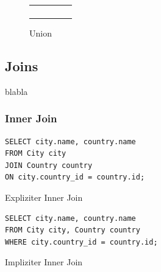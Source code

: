\documentclass[a4paper]{article}
\begin{document}
\begin{figure}[H]
\centering
  \begin{tabular}{| c | c | c | c | c |}
    \hline
    \cellcolor{cell} & \cellcolor{cell} & \cellcolor{cell} &  \cellcolor{cell} & \cellcolor{cell} \\ \hline
    \cellcolor{cell} & \cellcolor{cell} & \cellcolor{cell} &  \cellcolor{cell} & \cellcolor{cell} \\ \hline
    \cellcolor{cell} & \cellcolor{cell} & \cellcolor{cell} &  \cellcolor{cell} & \cellcolor{cell} \\ \hline
    \cellcolor{cell-odd} & \cellcolor{cell-odd} & \cellcolor{cell-odd} &  \cellcolor{cell-odd} & \cellcolor{cell-odd} \\ \hline
    \cellcolor{cell-odd} & \cellcolor{cell-odd} & \cellcolor{cell-odd} &  \cellcolor{cell-odd} & \cellcolor{cell-odd} \\ \hline
  \end{tabular}
\caption{Union}
\end{figure}

\subsection{Joins}
blabla

\subsubsection{Inner Join}

\begin{listing}[H]
\begin{verbatim}
SELECT city.name, country.name 
FROM City city 
JOIN Country country 
ON city.country_id = country.id;
\end{verbatim}
\caption{Expliziter Inner Join}
\end{listing}

\begin{listing}[H]
\begin{verbatim}
SELECT city.name, country.name 
FROM City city, Country country 
WHERE city.country_id = country.id;
\end{verbatim}
\caption{Impliziter Inner Join}
\end{listing}
\end{document}

